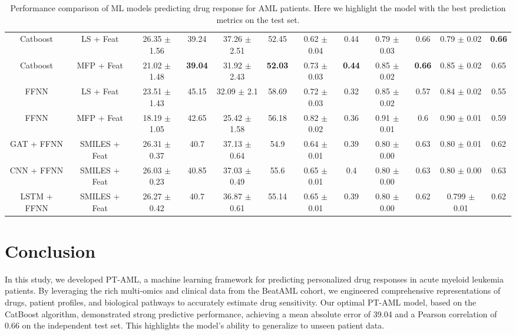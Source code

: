 \documentclass[runningheads,10pt]{llncs}
\begin{document}
\begin{table}[!ht]
{\begin{tabular}{|c|c|c|c|c|c|c|c|c|c|c|c|}
    Catboost & LS + Feat & 26.35 $\pm$ 1.56 & 39.24 & 37.26 $\pm$ 2.51 & 52.45 & 0.62 $\pm$ 0.04 & 0.44 & 0.79 $\pm$ 0.03 & 0.66 & 0.79 $\pm$ 0.02 & \textbf{0.66} \\
    Catboost & MFP + Feat & 21.02 $\pm$ 1.48 & \textbf{39.04} & 31.92 $\pm$ 2.43 & \textbf{52.03} & 0.73 $\pm$ 0.03 & \textbf{0.44} & 0.85 $\pm$ 0.02 & \textbf{0.66} & 0.85 $\pm$ 0.02 & 0.65 \\
    FFNN & LS + Feat & 23.51 $\pm$ 1.43 & 45.15 & 32.09 $\pm$ 2.1 & 58.69 & 0.72 $\pm$ 0.03 & 0.32 & 0.85 $\pm$ 0.02 & 0.57 & 0.84 $\pm$ 0.02 & 0.55 \\
    FFNN & MFP + Feat & 18.19 $\pm$ 1.05 & 42.65 & 25.42 $\pm$ 1.58 & 56.18 & 0.82 $\pm$ 0.02 & 0.36 & 0.91 $\pm$ 0.01 & 0.6 & 0.90 $\pm$ 0.01 & 0.59 \\
    GAT + FFNN & SMILES + Feat & 26.31 $\pm$ 0.37 & 40.7 & 37.13 $\pm$ 0.64 & 54.9 & 0.64 $\pm$ 0.01 & 0.39 & 0.80 $\pm$ 0.00 & 0.63 & 0.80 $\pm$ 0.01 & 0.62 \\
    CNN + FFNN & SMILES + Feat & 26.03 $\pm$ 0.23 & 40.85 & 37.03 $\pm$ 0.49 & 55.6 & 0.65 $\pm$ 0.01 & 0.4 & 0.80 $\pm$ 0.00 & 0.63 & 0.80 $\pm$ 0.00 & 0.63 \\
    LSTM + FFNN & SMILES + Feat & 26.27 $\pm$ 0.42 & 40.7 & 36.87 $\pm$ 0.61 & 55.14 & 0.65 $\pm$ 0.01 & 0.39 & 0.80 $\pm$ 0.00 & 0.62 & 0.799 $\pm$ 0.01 & 0.62 \\
    \hline 
    \end{tabular}
    }
    \caption{Performance comparison of ML models predicting drug response for AML patients. Here we highlight the model with the best prediction metrics on the test set.}
    \label{table:t1}
\end{table}
\section{Conclusion}
In this study, we developed PT-AML, a machine learning framework for predicting personalized drug responses in acute myeloid leukemia patients. By leveraging the rich multi-omics and clinical data from the BeatAML cohort, we engineered comprehensive representations of drugs, patient profiles, and biological pathways to accurately estimate drug sensitivity.
Our optimal PT-AML model, based on the CatBoost algorithm, demonstrated strong predictive performance, achieving a mean absolute error of 39.04 and a Pearson correlation of 0.66 on the independent test set. This highlights the model's ability to generalize to unseen patient data.
\end{document}

